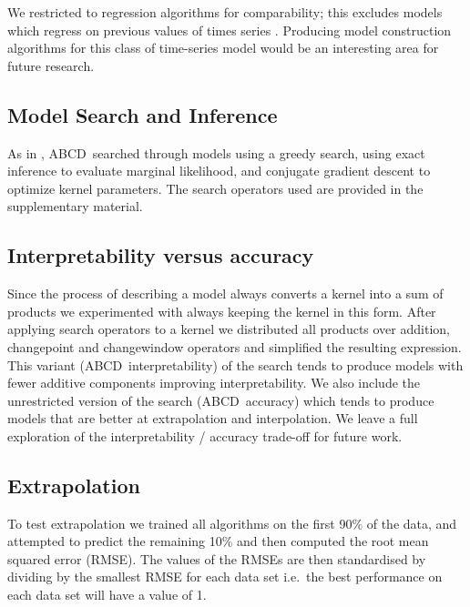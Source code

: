 \documentclass[letterpaper]{article}
\def\ie{i.e.\ }
\newcommand{\procedurename}{ABCD\ }
\begin{document}
We restricted to regression algorithms for comparability; this excludes models which regress on previous values of times series \citep[e.g.][]{box2013time}.
Producing model construction algorithms for this class of time-series model would be an interesting area for future research.

\subsection{Model Search and Inference}

As in \citep{DuvLloGroetal13}, \procedurename searched through models using a greedy search, using exact \gp{} inference to evaluate marginal likelihood, and conjugate gradient descent to optimize kernel parameters.
The search operators used are provided in the supplementary material.

\subsection{Interpretability versus accuracy}

Since the process of describing a model always converts a kernel into a sum of products we experimented with always keeping the kernel in this form.
After applying search operators to a kernel we distributed all products over addition, changepoint and changewindow operators and simplified the resulting expression.
This variant (\procedurename interpretability) of the search tends to produce models with fewer additive components improving interpretability.
We also include the unrestricted version of the search (\procedurename accuracy) which tends to produce models that are better at extrapolation and interpolation.
%
We leave a full exploration of the interpretability / accuracy trade-off for future work.

\subsection{Extrapolation}

To test extrapolation we trained all algorithms on the first 90\% of the data, and attempted to predict the remaining 10\% and then computed the root mean squared error (RMSE).
The values of the RMSEs are then standardised by dividing by the smallest RMSE for each data set \ie the best performance on each data set will have a value of 1.
\end{document}
